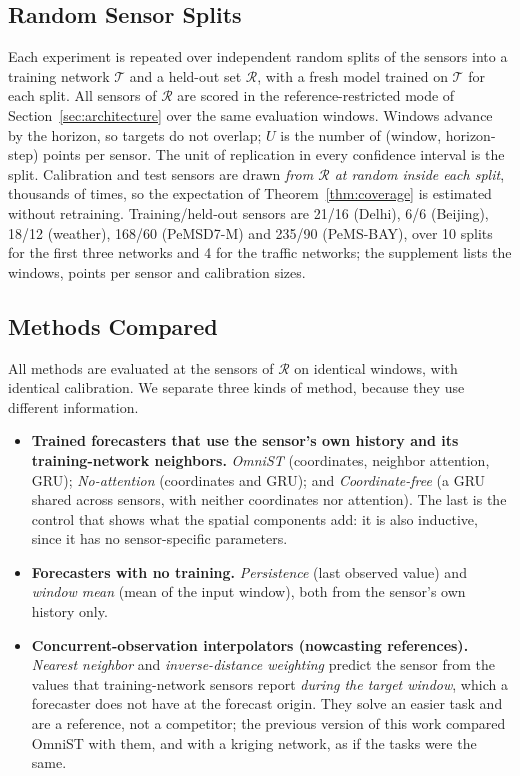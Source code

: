\subsection{Random Sensor Splits}
\label{sec:splits}
Each experiment is repeated over independent random splits of the sensors into a training network
$\mathcal{T}$ and a held-out set $\mathcal{R}$, with a fresh model trained on $\mathcal{T}$ for each split. All
sensors of $\mathcal{R}$ are scored in the reference-restricted mode of Section~\ref{sec:architecture} over the same
evaluation windows. Windows advance by the horizon, so targets do not overlap; $U$ is the number of (window,
horizon-step) points per sensor. The unit of replication in every confidence interval is the split. Calibration and
test sensors are drawn \emph{from $\mathcal{R}$ at random inside each split}, thousands of times, so the expectation
of Theorem~\ref{thm:coverage} is estimated without retraining.
Training/held-out sensors are 21/16 (Delhi), 6/6 (Beijing), 18/12 (weather), 168/60 (PeMSD7-M) and 235/90
(PeMS-BAY), over 10 splits for the first three networks and 4 for the traffic networks; the supplement lists
the windows, points per sensor and calibration sizes.

\subsection{Methods Compared}
All methods are evaluated at the sensors of $\mathcal{R}$ on identical windows, with identical
calibration. We separate three kinds of method, because they use different information.
\begin{itemize}
\item \textbf{Trained forecasters that use the sensor's own history and its training-network
neighbors.} \emph{OmniST} (coordinates, neighbor attention, GRU); \emph{No-attention}
(coordinates and GRU); and \emph{Coordinate-free} (a GRU shared across sensors, with neither
coordinates nor attention). The last is the control that shows what the spatial components add: it is
also inductive, since it has no sensor-specific parameters.
\item \textbf{Forecasters with no training.} \emph{Persistence} (last observed value) and
\emph{window mean} (mean of the input window), both from the sensor's own history only.
\item \textbf{Concurrent-observation interpolators (nowcasting references).} \emph{Nearest
neighbor} and \emph{inverse-distance weighting} predict the sensor from the values that training-network
sensors report \emph{during the target window}, which a forecaster does not have at the forecast origin. They solve
an easier task and are a reference, not a competitor; the previous version of this work compared OmniST with them,
and with a kriging network, as if the tasks were the same.
\end{itemize}

